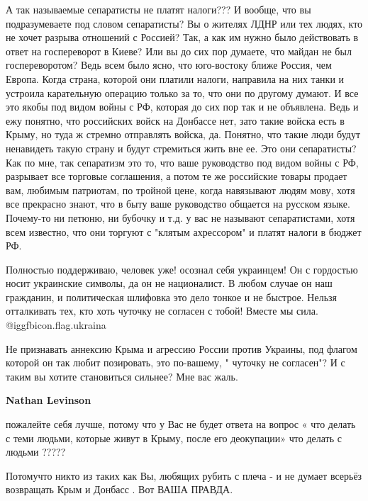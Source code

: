 \begin{itemize}
\begin{itemize}
А так называемые сепаратисты не платят налоги??? И вообще, что вы
подразумеваете под словом сепаратисты? Вы о жителях ЛДНР или тех людях, кто не
хочет разрыва отношений с Россией? Так, а как им нужно было действовать в ответ
на госпереворот в Киеве? Или вы до сих пор думаете, что майдан не был
госпереворотом? Ведь всем было ясно, что юго-востоку ближе Россия, чем Европа.
Когда страна, которой они платили налоги, направила на них танки и устроила
карательную операцию только за то, что они по другому думают. И все это якобы
под видом войны с РФ, которая до сих пор так и не объявлена. Ведь и ежу
понятно, что российских войск на Донбассе нет, зато такие войска есть в Крыму,
но туда ж стремно отправлять войска, да. Понятно, что такие люди будут
ненавидеть такую страну и будут стремиться жить вне ее. Это они сепаратисты?
Как по мне, так сепаратизм это то, что ваше руководство под видом войны с РФ,
разрывает все торговые соглашения, а потом те же российские товары продает вам,
любимым патриотам, по тройной цене, когда навязывают людям мову, хотя все
прекрасно знают, что в быту ваше руководство общается на русском языке.
Почему-то ни петюню, ни бубочку и т.д. у вас не называют сепаратистами, хотя
всем известно, что они торгуют с "клятым ахрессором" и платят налоги в бюджет
РФ.

\end{itemize} %


Полностью поддерживаю, человек уже! осознал себя украинцем! Он с гордостью
носит украинские символы, да он не националист. В любом случае он наш
гражданин, и политическая шлифовка это дело тонкое и не быстрое. Нельзя
отталкивать тех, кто хоть чуточку не согласен с тобой! Вместе мы сила. 
@igg{fbicon.flag.ukraina}

\begin{itemize} %

Не признавать аннексию Крыма и агрессию России против Украины, под флагом
которой он так любит позировать, это по-вашему, " чуточку не согласен"? И с
таким вы хотите становиться сильнее? Мне вас жаль.

\textbf{Nathan Levinson} 

пожалейте себя лучше, потому что у Вас не будет ответа на вопрос « что делать с
теми людьми, которые живут в Крыму, после его деокупации» что делать с людьми
?????


Потомучто никто из таких как Вы, любящих рубить с плеча - и не думает всерьёз возвращать Крым и Донбасс . Вот ВАША ПРАВДА.


\end{itemize}
\end{itemize}
